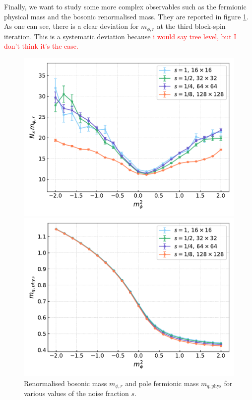 Finally, we want to study some more complex observables such as the fermionic physical mass and the bosonic renormalised mass. They are reported in figure \ref{fig:cooling_masses}. As one can see, there is a clear deviation for $m_{\phi, r}$ at the third block-spin iteration. This is a systematic deviation because \textcolor{red}{i would say tree level, but I don't think it's the case.}
\begin{figure}[hbp]
    \begin{minipage}{0.45\textwidth}
        \includegraphics[scale=0.45]{figures/cooling/mass_scan/mphir.pdf}
    \end{minipage}
    \hfill 
    \begin{minipage}{0.45\textwidth}
        \includegraphics[scale=0.45]{figures/cooling/mass_scan/mqphys.pdf}
    \end{minipage}
    \caption[Masses in the cooling procedure]{Renormalised bosonic mass $m_{\phi, r}$ and pole fermionic mass $m_{q,\text{phys}}$ for various values of the noise fraction $s$.}
    \label{fig:cooling_masses}
\end{figure}


